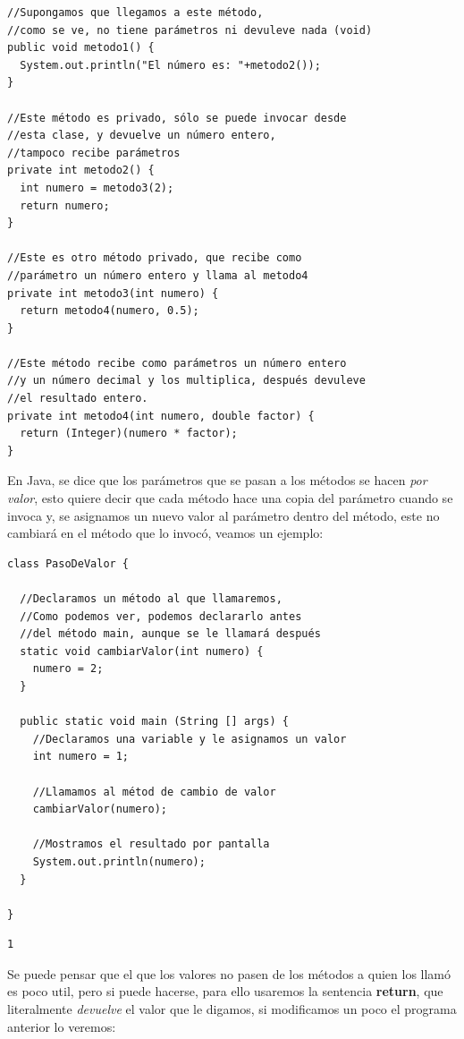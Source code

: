 \documentclass[11pt]{article}
\begin{document}
\begin{verbatim}
//Supongamos que llegamos a este método,
//como se ve, no tiene parámetros ni devuleve nada (void)
public void metodo1() {
  System.out.println("El número es: "+metodo2());
}

//Este método es privado, sólo se puede invocar desde
//esta clase, y devuelve un número entero,
//tampoco recibe parámetros
private int metodo2() {
  int numero = metodo3(2);
  return numero;
}

//Este es otro método privado, que recibe como
//parámetro un número entero y llama al metodo4
private int metodo3(int numero) {
  return metodo4(numero, 0.5);
}

//Este método recibe como parámetros un número entero
//y un número decimal y los multiplica, después devuleve
//el resultado entero.
private int metodo4(int numero, double factor) {
  return (Integer)(numero * factor);
}
\end{verbatim}

En Java, se dice que los parámetros que se pasan a los métodos se hacen \emph{por valor}, esto quiere decir que cada método hace una copia del parámetro cuando se invoca y, se asignamos un nuevo valor al parámetro dentro del método, este no cambiará en el método que lo invocó, veamos un ejemplo:

\begin{verbatim}
class PasoDeValor {

  //Declaramos un método al que llamaremos,
  //Como podemos ver, podemos declararlo antes
  //del método main, aunque se le llamará después
  static void cambiarValor(int numero) {
    numero = 2;
  }

  public static void main (String [] args) {
    //Declaramos una variable y le asignamos un valor
    int numero = 1;

    //Llamamos al métod de cambio de valor
    cambiarValor(numero);

    //Mostramos el resultado por pantalla
    System.out.println(numero);
  }

}
\end{verbatim}

\begin{verbatim}
1
\end{verbatim}

Se puede pensar que el que los valores no pasen de los métodos a quien los llamó es poco util, pero si puede hacerse, para ello usaremos la sentencia \textbf{return}, que literalmente \emph{devuelve} el valor que le digamos, si modificamos un poco el programa anterior lo veremos:
\end{document}
